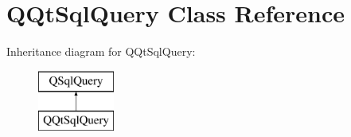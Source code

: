 \hypertarget{class_q_qt_sql_query}{}\section{Q\+Qt\+Sql\+Query Class Reference}
\label{class_q_qt_sql_query}
Inheritance diagram for Q\+Qt\+Sql\+Query\+:\begin{figure}[H]
\begin{center}
\leavevmode
\includegraphics[height=2.000000cm]{class_q_qt_sql_query}
\end{center}
\end{figure}
